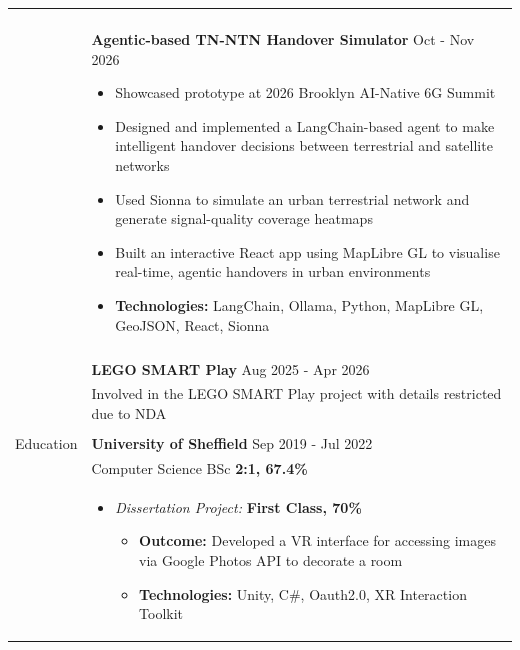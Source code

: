 \documentclass[11pt]{article}
\begin{document}
\begin{minipage}[t][0pt]{\linewidth}
\begin{tabular}[t]{p{2cm} p{14cm}}
	               \\ & \\ &

	               \textbf{Agentic-based TN-NTN Handover Simulator}  \hfill Oct - Nov 2026
	               \begin{itemize}
		               \renewcommand{\labelitemi}{$\diamond$}
		               \item Showcased prototype at 2026 Brooklyn AI-Native 6G Summit
		               \item Designed and implemented a LangChain-based agent to make intelligent handover decisions between terrestrial and satellite networks
		               \item Used Sionna to simulate an urban terrestrial network and generate signal-quality coverage heatmaps
		               \item Built an interactive React app using MapLibre GL to visualise real-time, agentic handovers in urban environments
		               \item \textbf{Technologies:} LangChain, Ollama, Python, MapLibre GL, GeoJSON, React, Sionna
	               \end{itemize}

	               \\ & \\ &


	               \textbf{LEGO SMART Play}  \hfill Aug 2025 - Apr 2026                                     \\ &
	               Involved in the LEGO SMART Play project with details restricted due to NDA

	               \\ \\

	               {Education}         &

	               \textbf{University of Sheffield} \hfill Sep 2019 - Jul 2022                              \\ &
	               Computer Science BSc \hfill \textbf{2:1, 67.4\%}                                         \\ &

	               \begin{itemize}
		               \renewcommand{\labelitemi}{$\diamond$}
		               \item \textit{Dissertation Project:} \hfill \textbf{First Class, 70\%}
		                     \begin{itemize}
			                     \renewcommand{\labelitemii}{$\cdot$}
			                     \item \textbf{Outcome:} Developed a VR interface for accessing images via Google Photos API to decorate a room
			                     \item \textbf{Technologies:} Unity, C\#, Oauth2.0, XR Interaction Toolkit
		                     \end{itemize}


\end{itemize}
\end{tabular}
\end{minipage}
\end{document}
